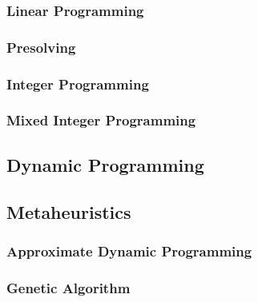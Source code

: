 \subsubsection{Linear Programming}
\subsubsection{Presolving}
\subsubsection{Integer Programming}
\subsubsection{Mixed Integer Programming} %

\subsection{Dynamic Programming} %
\subsection{Metaheuristics} %
\subsubsection{Approximate Dynamic Programming}
\subsubsection{Genetic Algorithm}
